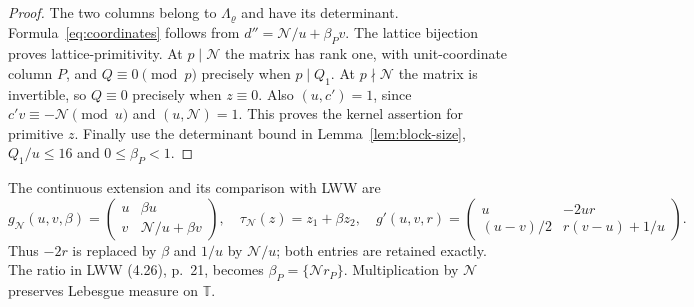 \documentclass[11pt]{article}
\theoremstyle{definition}
\newcommand{\GN}{\mathcal N}
\newcommand{\T}{\mathbb T}
\newcommand{\tauN}{\tau_{\GN}}
\newcommand{\gN}{g_{\GN}}
\theoremstyle{remark}
\numberwithin{equation}{section}
\begin{document}
\begin{proof}
The two columns belong to $\Lambda_\varrho$ and have its determinant.
Formula~\eqref{eq:coordinates} follows from
$d''=\GN/u+\beta_Pv$.
The lattice bijection proves lattice-primitivity.
At $p\mid\GN$ the matrix has rank one, with unit-coordinate column
$P$, and $Q\equiv0\pmod p$ precisely when $p\mid Q_1$.
At $p\nmid\GN$ the matrix is invertible, so $Q\equiv0$ precisely
when $z\equiv0$. Also $(u,c')=1$, since
$c'v\equiv-\GN\pmod u$ and $(u,\GN)=1$.
This proves the kernel assertion for primitive $z$.
Finally use the determinant bound in Lemma~\ref{lem:block-size},
$Q_1/u\le16$ and $0\le\beta_P<1$.
\end{proof}
The continuous extension and its comparison with LWW are
\begin{equation}\label{eq:continuous}
 \gN(u,v,\beta)=\begin{pmatrix}u&\beta u\\v&\GN/u+\beta v\end{pmatrix},
 \quad\tauN(z)=z_1+\beta z_2,
 \quad
 g'(u,v,r)=\begin{pmatrix}u&-2ur\\(u-v)/2&r(v-u)+1/u\end{pmatrix}.
\end{equation}
Thus $-2r$ is replaced by $\beta$ and $1/u$ by $\GN/u$; both
entries are retained exactly. The ratio in LWW (4.26), p.~21,
becomes $\beta_P=\{\GN r_P\}$. Multiplication by $\GN$ preserves
Lebesgue measure on $\T$.
\end{document}
